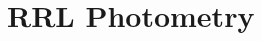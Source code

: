 \documentclass[a4paper,fleqn,usenatbib]{mnras}
\begin{document}

\clearpage

\newpage

\appendix


\setlength{\tabcolsep}{.5em}

\section{RRL Photometry}
\label{sec:phot_table_appendix}
\onecolumn
\end{document}
